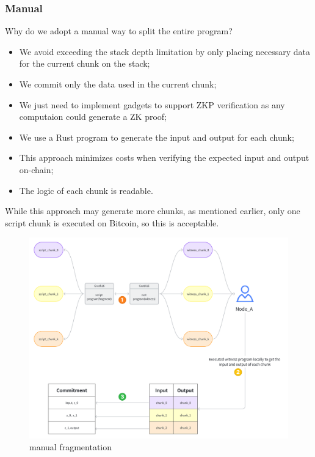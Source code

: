 \subsubsection{Manual}

Why do we adopt a manual way to split the entire program?

\begin{itemize}
    \item We avoid exceeding the stack depth limitation by only placing necessary data for the current chunk on the stack;
    \item We commit only the data used in the current chunk;
    \item We just need to implement gadgets to support ZKP verification as any computaion could generate a ZK proof;
    \item We use a Rust program to generate the input and output for each chunk;
    \item This approach minimizes costs when verifying the expected input and output on-chain;
    \item The logic of each chunk is readable.
\end{itemize}


While this approach may generate more chunks, as mentioned earlier, only one script chunk is executed on Bitcoin, so this is acceptable. 

\begin{figure}[ht] 
    \centering  
    \includegraphics[width=0.85\columnwidth]{images/manually-fragment.png} 
    \caption{manual fragmentation}
    \label{fig:manually-fragment}
\end{figure}

